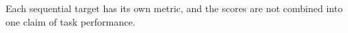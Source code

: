 Each sequential target has its own metric, and the scores are not combined into one
claim of task performance.
